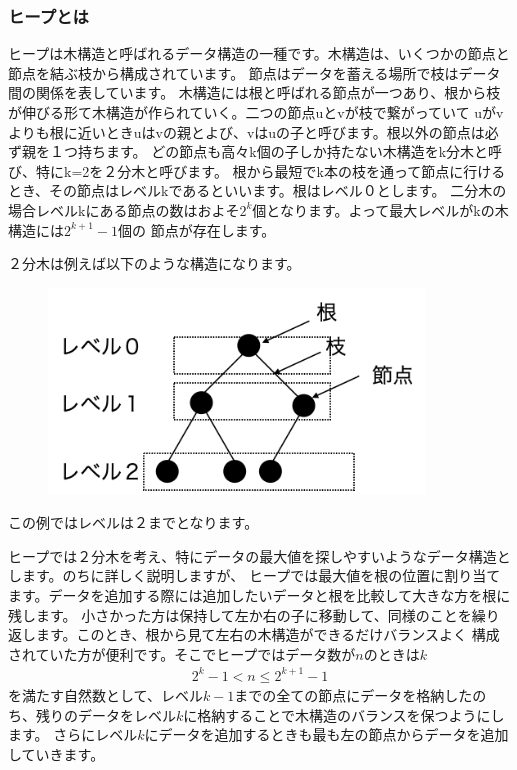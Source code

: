 \documentclass[dvipdfmx,pic,eepic,ecltree]{jarticle}
\begin{document}
\subsubsection{ヒープとは}
ヒープは木構造と呼ばれるデータ構造の一種です。木構造は、いくつかの節点と節点を結ぶ枝から構成されています。
節点はデータを蓄える場所で枝はデータ間の関係を表しています。
木構造には根と呼ばれる節点が一つあり、根から枝が伸びる形て木構造が作られていく。二つの節点uとvが枝で繋がっていて
uがvよりも根に近いときuはvの親とよび、vはuの子と呼びます。根以外の節点は必ず親を１つ持ちます。
どの節点も高々k個の子しか持たない木構造をk分木と呼び、特にk=2を２分木と呼びます。
根から最短でk本の枝を通って節点に行けるとき、その節点はレベルkであるといいます。根はレベル０とします。
二分木の場合レベルkにある節点の数はおよそ$2^{k}$個となります。よって最大レベルがkの木構造には$2^{k+1}-1$個の
節点が存在します。

２分木は例えば以下のような構造になります。
 \begin{figure}[H]
 \begin{center}
\includegraphics[width=100mm]{tree_example.png}
\end{center}
\end{figure}
この例ではレベルは２までとなります。

ヒープでは２分木を考え、特にデータの最大値を探しやすいようなデータ構造とします。のちに詳しく説明しますが、
ヒープでは最大値を根の位置に割り当てます。データを追加する際には追加したいデータと根を比較して大きな方を根に残します。
小さかった方は保持して左か右の子に移動して、同様のことを繰り返します。このとき、根から見て左右の木構造ができるだけバランスよく
構成されていた方が便利です。そこでヒープではデータ数が$n$のときは$k$
\begin{eqnarray}
2^{k}-1< n \leq 2^{k+1}-1
\end{eqnarray}
を満たす自然数として、レベル$k-1$までの全ての節点にデータを格納したのち、残りのデータをレベル$k$に格納することで木構造のバランスを保つようにします。
さらにレベル$k$にデータを追加するときも最も左の節点からデータを追加していきます。
\end{document}
